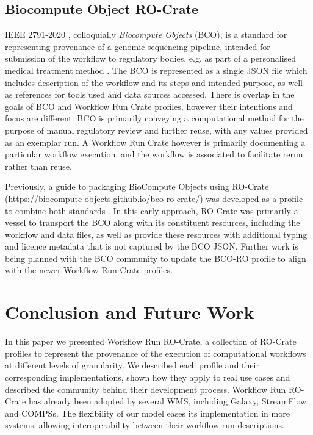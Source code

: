 \documentclass[10pt,letterpaper]{article}
\begin{document}
\subsection{Biocompute Object RO-Crate}\label{bco-crate}
IEEE 2791-2020 \cite{Mazumder 2020}, colloquially \emph{Biocompute Objects} (BCO), is a standard for representing provenance of a genomic sequencing pipeline, intended for submission of the workflow to regulatory bodies, e.g. as part of a personalised medical treatment method \cite{Alterovitz 2018}. 
The BCO is represented as a single JSON file which includes description of the workflow and its steps and intended purpose, as well as references for tools used and data sources accessed. 
There is overlap in the goals of BCO and Workflow Run Crate profiles, however their intentions and focus are different. 
BCO is primarily conveying a computational method for the purpose of manual regulatory review and further reuse, with any values provided as an exemplar run.  
A Workflow Run Crate however is primarily documenting a particular workflow execution, and the workflow is associated to facilitate rerun rather than reuse. 

Previously, a guide to packaging BioCompute Objects using RO-Crate (\url{https://biocompute-objects.github.io/bco-ro-crate/}) was developed as a profile to combine both standards \cite{Soiland-Reyes 2021}.
In this early approach, RO-Crate was primarily a vessel to transport the BCO along with its constituent resources, including the workflow and data files, as well as provide these resources with additional typing and licence metadata that is not captured by the BCO JSON. 
Further work is being planned with the BCO community to update the BCO-RO profile to align with the newer Workflow Run Crate profiles. 

\hypertarget{conclusion}{%
\section{Conclusion and Future Work}\label{conclusion}}

In this paper we presented Workflow Run RO-Crate, a collection of RO-Crate profiles to represent the provenance of the execution of computational workflows at different levels of granularity.
We described each profile and their corresponding implementations, shown how they apply to real use cases and described the community behind their development process.
Workflow Run RO-Crate has already been adopted by several WMS, including Galaxy, StreamFlow and COMPSs. The flexibility of our model eases its implementation in more systems, allowing interoperability between their workflow run descriptions.
\end{document}
